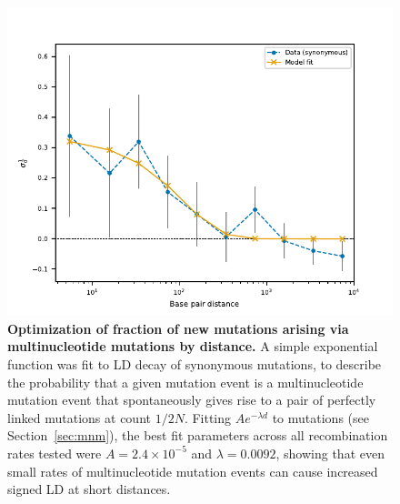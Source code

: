 \documentclass[]{article}
\begin{document}
\begin{figure}[ht!]
    \centering
    \includegraphics{../figures/msl_mnms.v2}
    \caption{
        \textbf{Optimization of fraction of new mutations arising via
        multinucleotide mutations by distance.} 
        A simple exponential function was fit to LD decay of synonymous mutations,
        to describe the probability that a given mutation event is a multinucleotide
        mutation event that spontaneously gives rise to a pair of perfectly linked
        mutations at count \(1/2N\).
        Fitting \(Ae^{-\lambda d}\) to mutations (see Section~\ref{sec:mnm}),
        the best fit parameters across all recombination rates
        tested were \(A=2.4\times10^{-5}\) and \(\lambda=0.0092\), showing that even
        small rates of multinucleotide mutation events can cause increased signed
        LD at short distances.
    }
    \label{fig:mslmnms}
\end{figure}
\end{document}

